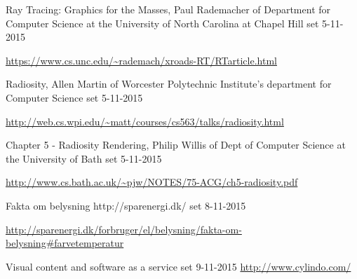 \begin{thebibliography}{99}
  Ray Tracing: Graphics for the Masses, 
  Paul Rademacher of Department for Computer Science at the University of North Carolina at Chapel Hill
  set 5-11-2015

  \url{https://www.cs.unc.edu/~rademach/xroads-RT/RTarticle.html}

  Radiosity,
  Allen Martin of Worcester Polytechnic Institute's department for Computer Science
  set 5-11-2015

  \url{http://web.cs.wpi.edu/~matt/courses/cs563/talks/radiosity.html}

  Chapter 5 - Radiosity Rendering,
  Philip Willis of Dept of Computer Science at the University of Bath
  set 5-11-2015

  \url{http://www.cs.bath.ac.uk/~pjw/NOTES/75-ACG/ch5-radiosity.pdf}
  
  Fakta om belysning
  http://sparenergi.dk/
  set 8-11-2015
  
  \url{http://sparenergi.dk/forbruger/el/belysning/fakta-om-belysning#farvetemperatur}

  Visual content and software as a service
  set 9-11-2015
  \url{http://www.cylindo.com/}

\end{thebibliography}
\clearpage